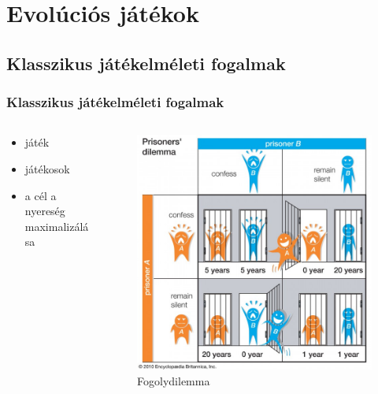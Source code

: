 \section{Evolúciós játékok}

\subsection{Klasszikus játékelméleti fogalmak}
\begin{frame}
\frametitle{Klasszikus játékelméleti fogalmak}
\begin{columns}[T]
	\begin{column}{0.5\linewidth}
\begin{itemize}
	\item játék
	\item játékosok
	\item a cél a nyereség maximalizálása
\end{itemize}

	\end{column}

	\begin{column}{0.5\linewidth}
\begin{figure}
	\includegraphics[width=\linewidth]{images/prisoners_dilemma}
	\caption{Fogolydilemma}
\end{figure}
	\end{column}
\end{columns}

\end{frame}


